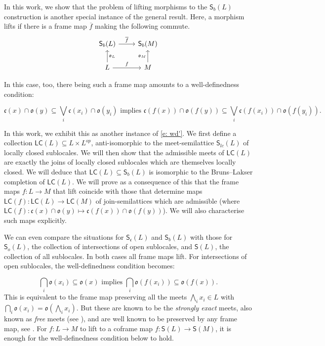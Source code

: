 \documentclass[11pt,a4paper,reqno]{amsart}
\newcommand{\tbigvee}{\mathop{\textstyle \bigvee }}%
\def\SS{\mathsf{S}}
\def\cl{\mathfrak{c}}
\def\op{\mathfrak{o}}
\theoremstyle{definition}
\theoremstyle{remark}
\newcommand{\mf}{\mathsf}
\newcommand{\se}{\subseteq}
\newcommand{\bca}{\bigcap}
\newcommand{\Sc}{\mf{S}_{\cl}}
\newcommand{\Sb}{\mf{S}_b}
\begin{document}
In this work, we show that the problem of lifting morphisms to the $\Sb(L)$ construction is another special instance of the general result. 
Here, a morphism lifts if there is a frame map $\overline{f}$ making the following commute.
\[
\begin{tikzcd}
	{\SS_b(L)} & {\SS_b(M)} \\
	L & M
	\arrow["{{\overline{f}}}", from=1-1, to=1-2]
	\arrow["{{\op_L}}"', from=2-1, to=1-1]
	\arrow["f", from=2-1, to=2-2]
	\arrow["{{\op_M}}", from=2-2, to=1-2]
\end{tikzcd}
\label{square that has to commute}
\]

In this case, too, there being such a frame map amounts to a well-definedness condition:

\begin{equation*}
\cl(x)\cap \op(y)\se \tbigvee_i \cl(x_i)\cap \op(y_i) \text{ implies }\cl(f(x))\cap \op(f(y))\se \tbigvee_i \cl(f(x_i))\cap \op(f(y_i)).   \tag{WDb} \label{e: wdb}
\end{equation*}

In this work, we exhibit this as another instance of \eqref{e: wd'}. We first define a collection $\mf{LC}(L)\se L\times L^{op}$, anti-isomorphic to the meet-semilattice $\mf{S}_{lc}(L)$ of locally closed sublocales. We will then show that the admissible meets of $\mf{LC}(L)$ are exactly the joins of locally closed sublocales which are themselves locally closed. We will deduce that $\mf{LC}(L)\se \Sb(L)$ is isomorphic to the Bruns--Lakser completion of $\mf{LC}(L)$. We will prove as a consequence of this that the frame maps $f:L\to M$ that lift coincide with those that determine maps $\mf{LC}(f):\mf{LC}(L)\to \mf{LC}(M)$ of join-semilattices which are admissible (where $\mf{LC}(f):\cl(x)\cap \op(y)\mapsto \cl(f(x))\cap \op(f(y))$). We will also characterise such maps explicitly. 

We can even compare the situations for $\Sc(L)$ and $\Sb(L)$ with those for $\mf{S}_o(L)$, the collection of intersections of open sublocales, and $\mf{S}(L)$, the collection of all sublocales. In both cases all frame maps lift. For intersections of open sublocales, the well-definedness condition becomes:

\begin{equation*}
\bca_i \op(x_i)\se \op(x)\text{ implies }\bca_i \op(f(x_i))\se \op(f(x)).   \tag{WDo} \label{e: wdo}
\end{equation*}
This is equivalent to the frame map preserving all the meets $\bigwedge_i x_i\in L$ with $\bca_i \op(x_i)=\op(\bigwedge_i x_i)$. But these are known to be the \emph{strongly exact} meets, also known as \emph{free} meets (see \cite{wilson94}), and are well known to be preserved by any frame map, see \cite[3.5]{notesball}.
For $f:L\to M$ to lift to a coframe map $f:\mf{S}(L)\to \mf{S}(M)$, it is enough for the well-definedness condition below to hold.
\end{document}
